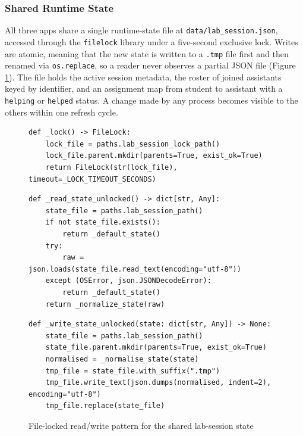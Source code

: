 \subsubsection{Shared Runtime State} \label{sec:shared-state}



All three apps share a single runtime-state file at \texttt{data/lab\_session.json}, accessed through the \texttt{filelock} library under a five-second exclusive lock.   
Writes are atomic, meaning that the new state is written to a \texttt{.tmp} file first and then renamed via \texttt{os.replace}, so a reader never observes a partial JSON file (Figure \ref{fig:code-lablock}).
The file holds the active session metadata, the roster of joined assistants keyed by identifier, and an assignment map from student to assistant with a \texttt{helping} or \texttt{helped} status.
A change made by any process becomes visible to the others within one refresh cycle.

\begin{figure}[H]
    \centering
    \begin{minipage}{0.92\linewidth}
\begin{lstlisting}[firstnumber=38]
def _lock() -> FileLock:
    lock_file = paths.lab_session_lock_path()
    lock_file.parent.mkdir(parents=True, exist_ok=True)
    return FileLock(str(lock_file), timeout=_LOCK_TIMEOUT_SECONDS)
\end{lstlisting}

\begin{lstlisting}[firstnumber=131]
def _read_state_unlocked() -> dict[str, Any]:
    state_file = paths.lab_session_path()
    if not state_file.exists():
        return _default_state()
    try:
        raw = json.loads(state_file.read_text(encoding="utf-8"))
    except (OSError, json.JSONDecodeError):
        return _default_state()
    return _normalize_state(raw)
\end{lstlisting}

\begin{lstlisting}[firstnumber=142]
def _write_state_unlocked(state: dict[str, Any]) -> None:
    state_file = paths.lab_session_path()
    state_file.parent.mkdir(parents=True, exist_ok=True)
    normalised = _normalise_state(state)
    tmp_file = state_file.with_suffix(".tmp")
    tmp_file.write_text(json.dumps(normalised, indent=2), encoding="utf-8")
    tmp_file.replace(state_file)
\end{lstlisting}
    \end{minipage}
    \caption{File-locked read/write pattern for the shared lab-session state}
    \label{fig:code-lablock}
\end{figure}

